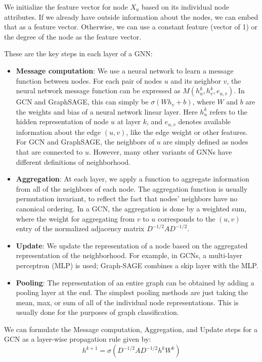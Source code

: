 \documentclass{article}
\numberwithin{figure}{section}
\begin{document}
	We initialize the feature vector for node $X_u$ based on its individual node attributes. If we already have outside information about the nodes, we can embed that as a feature vector. Otherwise, we can use a constant feature (vector of 1) or the degree of the node as the feature vector.
	
	These are the key steps in each layer of a GNN:
	\begin{itemize}
		\item \textbf{Message computation}: We use a neural network to learn a message function between nodes. For each pair of nodes $u$ and its neighbor $v$, the neural network message function can be expressed as $M(h^k_u,h^k_v,e_{u,v})$. In GCN and GraphSAGE, this can simply be $\sigma(W h_v + b)$, where $W$ and $b$ are the weights and bias of a neural network linear layer. Here $h^k_u$ refers to the hidden representation of node $u$ at layer $k$, and $e_{u,v}$ denotes available information about the edge $(u, v)$, like the edge weight or other features. For GCN and GraphSAGE, the neighbors of $u$ are simply defined as nodes that are connected to $u$. However, many other variants of GNNs have different definitions of neighborhood.
		\item \textbf{Aggregation}: At each layer, we apply a function to aggregate information from all of the neighbors of each node. The aggregation function is usually permutation invariant, to reflect the fact that nodes’ neighbors have no canonical ordering. In a GCN, the aggregation is done by a weighted sum, where the weight for aggregating from $v$ to $u$ corresponds to the $(u,v)$ entry of the normalized adjacency matrix $D^{-1/2}AD^{-1/2}$.
		\item \textbf{Update}: We update the representation of a node based on the aggregated representation of the neighborhood. For example, in GCNs, a multi-layer perceptron (MLP) is used; Graph-SAGE combines a skip layer with the MLP.
		\item \textbf{Pooling}: The representation of an entire graph can be obtained by adding a pooling layer at the end. The simplest pooling methods are just taking the mean, max, or sum of all of the individual node representations. This is usually done for the purposes of graph classification.
	\end{itemize}
	
	We can formulate the Message computation, Aggregation, and Update steps for a GCN as a layer-wise propagation rule given by:
	\begin{equation}
		h^{k+1} = \sigma(D^{-1/2} A D^{-1/2} h^k W^k)
	\end{equation}
	
\end{document}
